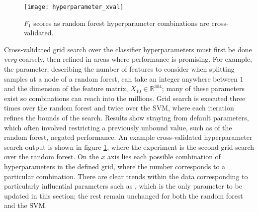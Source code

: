             \begin{figure}[ht]
                \centering
                \texttt{[image: hyperparameter\_xval]}
                \caption{$F_{1}$ scores as random forest hyperparameter combinations are cross-validated.}
                \label{fig:exp-clf-opt-hyp}
            \end{figure}
            
            Cross-validated grid search over the classifier hyperparameters must first be done \textit{very} coarsely, then refined in areas where performance is promising. For example, the  parameter, describing the number of features to consider when splitting samples at a node of a random forest, can take an integer anywhere between $1$ and the dimension of the feature matrix, $X_{10} \in \mathbb{R}^{304}$; many of these parameters exist so combinations can reach into the millions. Grid search is executed three times over the random forest and twice over the SVM, where each iteration refines the bounds of the search. Results show straying from default parameters, which often involved restricting a previously unbound value, such as  of the random forest, negated performance. An example cross-validated hyperparameter search output is shown in figure \ref{fig:exp-clf-opt-hyp}, where the experiment is the second grid-search over the random forest. On the $x$ axis lies each possible combination of hyperparameters in the defined grid, where the number corresponds to a particular combination. There are clear trends within the data corresponding to particularly influential parameters such as , which is the only parameter to be updated in this section; the rest remain unchanged for both the random forest and the SVM. 
            
            
            
            
